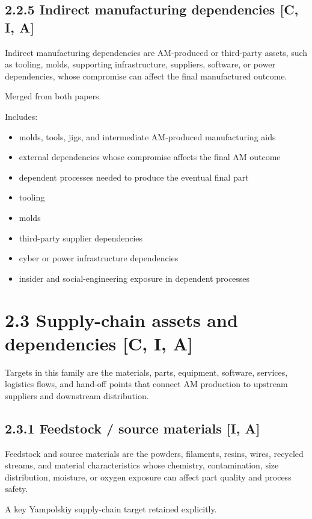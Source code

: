 \documentclass[10pt,a4paper,oneside]{report}
\begin{document}
\subsection{2.2.5 Indirect manufacturing dependencies [C, I, A]}


Indirect manufacturing dependencies are AM-produced or third-party assets, such as tooling, molds, supporting infrastructure, suppliers, software, or power dependencies, whose compromise can affect the final manufactured outcome.

Merged from both papers.

Includes:

\begin{itemize}
\item molds, tools, jigs, and intermediate AM-produced manufacturing aids
\item external dependencies whose compromise affects the final AM outcome
\item dependent processes needed to produce the eventual final part
\item tooling
\item molds
\item third-party supplier dependencies
\item cyber or power infrastructure dependencies
\item insider and social-engineering exposure in dependent processes
\end{itemize}


\section{2.3 Supply-chain assets and dependencies [C, I, A]}


Targets in this family are the materials, parts, equipment, software, services, logistics flows, and hand-off points that connect AM production to upstream suppliers and downstream distribution.


\subsection{2.3.1 Feedstock / source materials [I, A]}


Feedstock and source materials are the powders, filaments, resins, wires, recycled streams, and material characteristics whose chemistry, contamination, size distribution, moisture, or oxygen exposure can affect part quality and process safety.

A key Yampolskiy supply-chain target retained explicitly.
\end{document}
